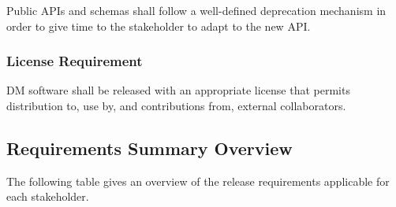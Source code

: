 Public APIs and schemas shall follow a well-defined deprecation mechanism in order to give time to the stakeholder to adapt to the new API.


\subsubsection{License Requirement} \label{sec:license}

DM software shall be released with an appropriate license that permits distribution to, use by, and contributions from, external collaborators.


\subsection{Requirements Summary Overview} \label{sec:overview}

The following table gives an overview of the release requirements applicable for each stakeholder.

